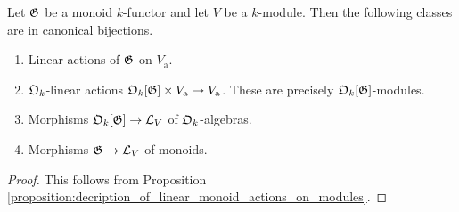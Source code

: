 \begin{corollary}\label{proposition:decription_of_linear_monoid_actions_on_modules}
Let ${\mathfrak G}$ be a monoid $k$-functor and let $V$ be a $k$-module. Then the following classes are in canonical bijections.
\begin{enumerate}[label=\emph{\textbf{(\arabic*)}}, leftmargin=1.5em]
\item Linear actions of ${\mathfrak G}$ on $V_{\mathrm{a}}$.
\item ${\mathfrak O}_k$-linear actions ${\mathfrak O}_k[{\mathfrak G}]\times V_{\mathrm{a}}\rightarrow V_{\mathrm{a}}$. These are precisely ${\mathfrak O}_k[{\mathfrak G}]$-modules.
\item Morphisms ${\mathfrak O}_k[{\mathfrak G}]\rightarrow {\mathcal L}_V$ of ${\mathfrak O}_k$-algebras.
\item Morphisms ${\mathfrak G}\rightarrow {\mathcal L}_V$ of monoids.
\end{enumerate}
\end{corollary}
\begin{proof}
This follows from Proposition \ref{proposition:decription_of_linear_monoid_actions_on_modules}.
\end{proof}






\small






